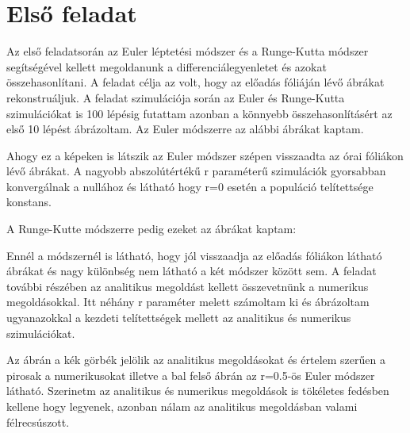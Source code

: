 \documentclass{article}[18pt]
\begin{document}
\section{Első feladat}
Az első feladatsorán az Euler léptetési módszer és a Runge-Kutta módszer segítségével kellett megoldanunk a differenciálegyenletet és azokat összehasonlítani. A feladat célja az volt, hogy az előadás fóliáján lévő ábrákat rekonstruáljuk. A feladat szimulációja során az Euler és Runge-Kutta szimulációkat is 100 lépésig futattam azonban a könnyebb összehasonlításért az első 10 lépést ábrázoltam.
Az Euler módszerre az alábbi ábrákat kaptam.

\begin{figure}[h]
    \centering
    \qquad
    \qquad
    \qquad
    \qquad
\end{figure}

Ahogy ez a képeken is látszik az Euler módszer szépen visszaadta az órai fóliákon lévő ábrákat. A nagyobb abszolútértékű r paraméterű szimulációk gyorsabban konvergálnak a nullához és látható hogy r=0 esetén a populáció telítettsége konstans. 

A Runge-Kutte módszerre pedig ezeket az ábrákat kaptam: 
\newpage
\begin{figure}[h]
    \centering
    \qquad
    \qquad
    \qquad
    \qquad
\end{figure}

Ennél a módszernél is látható, hogy jól visszaadja az előadás fóliákon látható ábrákat és nagy különbség nem látható a két módszer között sem.
\newpage
A feladat további részében az analitikus megoldást kellett összevetnünk a numerikus megoldásokkal. Itt néhány r paraméter melett számoltam ki és ábrázoltam ugyanazokkal a kezdeti telítettségek mellett az analitikus és numerikus szimulációkat. 

\begin{figure}[h]
    \centering
    \qquad
    \qquad
    \qquad
\end{figure}
Az ábrán a kék görbék jelölik az analitikus megoldásokat és értelem szerűen a pirosak a numerikusokat illetve a bal felső ábrán az r=0.5-ös Euler módszer látható. Szerinetm az analitikus és numerikus megoldások is tökéletes fedésben kellene hogy legyenek, azonban nálam az analitikus megoldásban valami félrecsúszott.
\end{document}
